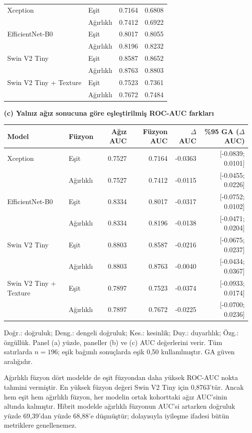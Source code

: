 \documentclass[a4paper]{elektr}
\begin{document}
\begin{table}[!htbp]
\begin{minipage}{15.8cm}
\begin{tabular*}{\linewidth}{@{\extracolsep{\fill}}llrr@{}}
Xception & Eşit & 0.7164 & 0.6808 \\
 & Ağırlıklı & 0.7412 & 0.6922 \\
EfficientNet-B0 & Eşit & 0.8017 & 0.8055 \\
 & Ağırlıklı & 0.8196 & 0.8232 \\
Swin V2 Tiny & Eşit & 0.8587 & 0.8652 \\
 & Ağırlıklı & 0.8763 & 0.8803 \\
Swin V2 Tiny + Texture & Eşit & 0.7523 & 0.7361 \\
 & Ağırlıklı & 0.7672 & 0.7484 \\
\bottomrule\end{tabular*}
\par\medskip
\textbf{(c) Yalnız ağız sonucuna göre eşleştirilmiş ROC-AUC farkları}\par\smallskip
\begin{tabular*}{\linewidth}{@{\extracolsep{\fill}}llrrrr@{}}
\toprule
Model & Füzyon & Ağız AUC & Füzyon AUC & $\Delta$AUC & \%95 GA ($\Delta$AUC)\\\midrule
Xception & Eşit & 0.7527 & 0.7164 & -0.0363 & [-0.0839; 0.0101] \\
 & Ağırlıklı & 0.7527 & 0.7412 & -0.0115 & [-0.0455; 0.0226] \\
EfficientNet-B0 & Eşit & 0.8334 & 0.8017 & -0.0317 & [-0.0752; 0.0102] \\
 & Ağırlıklı & 0.8334 & 0.8196 & -0.0138 & [-0.0471; 0.0204] \\
Swin V2 Tiny & Eşit & 0.8803 & 0.8587 & -0.0216 & [-0.0675; 0.0237] \\
 & Ağırlıklı & 0.8803 & 0.8763 & -0.0040 & [-0.0434; 0.0367] \\
Swin V2 Tiny + Texture & Eşit & 0.7897 & 0.7523 & -0.0374 & [-0.0933; 0.0174] \\
 & Ağırlıklı & 0.7897 & 0.7672 & -0.0225 & [-0.0700; 0.0236] \\\bottomrule
\end{tabular*}
\par\smallskip\small
Doğr.: doğruluk; Deng.: dengeli doğruluk; Kes.: kesinlik; Duy.: duyarlılık; Özg.: özgüllük. Panel (a) yüzde, paneller (b) ve (c) AUC değerlerini verir. Tüm satırlarda $n = 196$; eşik bağımlı sonuçlarda eşik 0,50 kullanılmıştır. GA güven aralığıdır.
\end{minipage}\end{table}

Ağırlıklı füzyon dört modelde de eşit füzyondan daha yüksek ROC-AUC nokta tahmini vermiştir. En yüksek füzyon değeri Swin V2 Tiny için 0,8763'tür. Ancak hem eşit hem ağırlıklı füzyon, her modelin ortak kohorttaki ağız AUC'sinin altında kalmıştır. Hibrit modelde ağırlıklı füzyonun AUC'si artarken doğruluk yüzde 69,39'dan yüzde 68,88'e düşmüştür; dolayısıyla iyileşme ifadesi bütün metriklere genellenemez.
\end{document}
